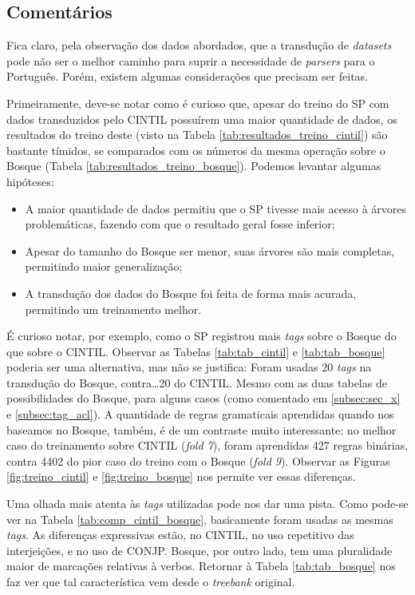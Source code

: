 \subsection{Comentários}
\label{subsec:result_coment}

Fica claro, pela observação dos dados abordados, que a transdução de \textit{datasets} pode não ser o melhor caminho para suprir a necessidade de \textit{parsers} para o Português. Porém, existem algumas considerações que precisam ser feitas.

Primeiramente, deve-se notar como é curioso que, apesar do treino do SP com dados transduzidos pelo CINTIL possuírem uma maior quantidade de dados, os resultados do treino deste (visto na Tabela \ref{tab:resultados_treino_cintil}) são bastante tímidos, se comparados com os números da mesma operação sobre o Bosque (Tabela \ref{tab:resultados_treino_bosque}). Podemos levantar algumas hipóteses: 
\begin{itemize}
    \item A maior quantidade de dados permitiu que o SP tivesse mais acesso à árvores problemáticas, fazendo com que o resultado geral fosse inferior;
    \item Apesar do tamanho do Bosque ser menor, suas árvores são mais completas, permitindo maior generalização;
    \item A transdução dos dados do Bosque foi feita de forma mais acurada, permitindo um treinamento melhor.
\end{itemize}

É curioso notar, por exemplo, como o SP registrou mais \textit{tags} sobre o Bosque do que sobre o CINTIL. Observar as Tabelas \ref{tab:tab_cintil} e \ref{tab:tab_bosque} poderia ser uma alternativa, mas não se justifica: Foram usadas 20 \textit{tags} na transdução do Bosque, contra\ldots 20 do CINTIL. Mesmo com as duas tabelas de possibilidades do Bosque, para alguns casos (como comentado em \ref{subsec:sec_x} e \ref{subsec:tag_acl}). A quantidade de regras gramaticais aprendidas quando nos baseamos no Bosque, também, é de um contraste muito interessante: no melhor caso do treinamento sobre CINTIL (\textit{fold 7}), foram aprendidas 427 regras binárias, contra 4402 do pior caso do treino com o Bosque (\textit{fold 9}). Observar as Figuras \ref{fig:treino_cintil} e \ref{fig:treino_bosque} nos permite ver essas diferenças.

Uma olhada mais atenta às \textit{tags} utilizadas pode nos dar uma pista. Como pode-se ver na Tabela \ref{tab:comp_cintil_bosque}, basicamente foram usadas as mesmas \textit{tags}. As diferenças expressivas estão, no CINTIL, no uso repetitivo das interjeições, e no uso de CONJP. Bosque, por outro lado, tem uma pluralidade maior de marcações relativas à verbos. Retornar à Tabela \ref{tab:tab_bosque} nos faz ver que tal característica vem desde o \textit{treebank} original. 
\begin{center}
    
\end{center}


